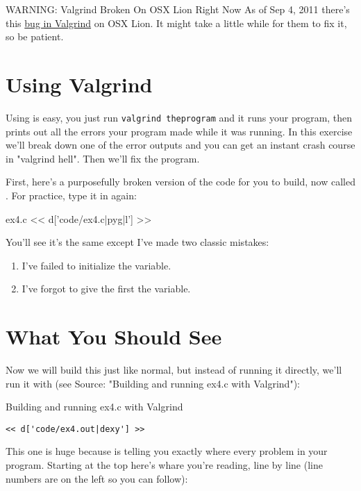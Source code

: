\begin{aside}{WARNING: Valgrind Broken On OSX Lion Right Now}
As of Sep 4, 2011 there's this \href{http://bit.ly/qRxc6s}{bug in Valgrind}
on OSX Lion.  It might take a little while for them to fix it, so be patient.
\end{aside}

\section{Using Valgrind}

Using  is easy, you just run \verb|valgrind theprogram| and it
runs your program, then prints out all the errors your program made while it
was running.  In this exercise we'll break down one of the error outputs
and you can get an instant crash course in "valgrind hell".  Then we'll
fix the program.

First, here's a purposefully broken version of the  code
for you to build, now called .  For practice, type it
in again:

\begin{code}{ex4.c}
<< d['code/ex4.c|pyg|l'] >>
\end{code}

You'll see it's the same except I've made two classic mistakes:

\begin{enumerate}
\item I've failed to initialize the  variable.
\item I've forgot to give the first  the  variable.
\end{enumerate}

\section{What You Should See}

Now we will build this just like normal, but instead of running it
directly, we'll run it with  (see Source: "Building and running ex4.c with Valgrind"):

\begin{Terminal}{Building and running ex4.c with Valgrind}
\begin{lstlisting}
<< d['code/ex4.out|dexy'] >>
\end{lstlisting}
\end{Terminal}

This one is huge because  is telling you exactly where
every problem in your program.  Starting at the top here's whare you're
reading, line by line (line numbers are on the left so you can follow):

